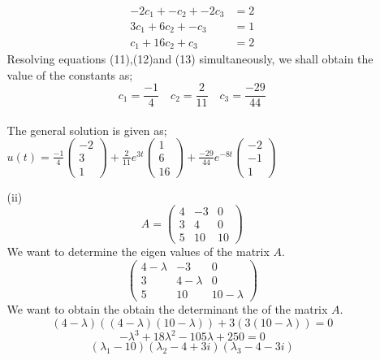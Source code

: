 \documentclass[12pt,a4paper]{article}
\begin{document}
\begin{itemize}
\begin{itemize}
\begin{align}
\end{align}
\begin{align}
-2c_{1}+-c_{2}+-2c_{3}&=2\\
3c_{1}+6c_{2}+-c_{3}&=1\\
c_{1}+16c_{2}+c_{3}&=2
\end{align}
Resolving equations (11),(12)and (13) simultaneously, we shall obtain the value of the constants as;\\
$$c_{1}=\frac{-1}{4}\quad c_{2}=\frac{2}{11}\quad c_{3}=\frac{-29}{44}$$\\
The general solution is given as;\\
$u\left(t\right)=\frac{-1}{4}\begin{pmatrix} -2 \\ 3 \\1 \end{pmatrix}+\frac{2}{11}e^{3t}\begin{pmatrix} 1 \\ 6 \\16 \end{pmatrix}+\frac{-29}{44}e^{-8t}\begin{pmatrix} -2 \\ -1 \\1 \end{pmatrix}$\\
\item[(ii)]
\begin{equation*}
A = 
\begin{pmatrix}
4 & -3 & 0 \\
3 & 4 & 0 \\
5 & 10 & 10
\end{pmatrix}
\end{equation*}
We want to determine the eigen values of the matrix $A$.\\
\begin{equation*}
\begin{pmatrix}
4-\lambda & -3 & 0 \\
3 & 4-\lambda & 0 \\
5 & 10 & 10-\lambda
\end{pmatrix}
\end{equation*}
We want to obtain the obtain the determinant the of the matrix $A$.\\
$$\left(4-\lambda\right)\left(\left(4-\lambda\right)\left(10-\lambda\right)\right)+3\left(3\left(10-\lambda\right)\right)=0$$
$$-\lambda^{3}+18\lambda^{2}-105\lambda+250=0$$
$$\left(\lambda_{1}-10\right)\left(\lambda_{2}-4+3i\right)\left(\lambda_{3}-4-3i\right)$$

\end{itemize}
\end{itemize}
\end{document}
